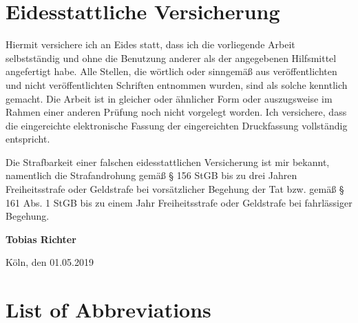\documentclass[a4paper, twoside, 12pt]{article}
\begin{document}
\section*{Eidesstattliche Versicherung}
\label{sec:SOOA}

\vspace{2.5cm}


Hiermit versichere ich an Eides statt, dass ich die vorliegende Arbeit selbstständig und ohne die Benutzung anderer als der angegebenen Hilfsmittel angefertigt habe. Alle Stellen, die wörtlich oder sinngemäß aus veröffentlichten und nicht veröffentlichten Schriften entnommen wurden, sind als solche kenntlich gemacht. Die Arbeit ist in gleicher oder ähnlicher Form oder auszugsweise im Rahmen einer anderen Prüfung noch nicht vorgelegt worden. Ich versichere, dass die eingereichte elektronische Fassung der eingereichten Druckfassung vollständig entspricht.

\vspace{1cm}

\noindent
Die Strafbarkeit einer falschen eidesstattlichen Versicherung ist mir bekannt, namentlich die Strafandrohung gemäß § 156 StGB bis zu drei Jahren Freiheitsstrafe oder Geldstrafe bei vorsätzlicher Begehung der Tat bzw. gemäß § 161 Abs. 1 StGB bis zu einem Jahr Freiheitsstrafe oder Geldstrafe bei fahrlässiger Begehung.

\vspace{3cm}
\noindent
\textbf{Tobias Richter}

\vspace{0.5cm}
\noindent
Köln, den 01.05.2019
\clearpage

\setcounter{page}{1}
\tableofcontents
\clearpage
\listoffigures
\clearpage
\listoftables
\clearpage

\section*{List of Abbreviations} 
\begin{acronym}[GCRM]
\end{acronym}
\clearpage
\end{document}
